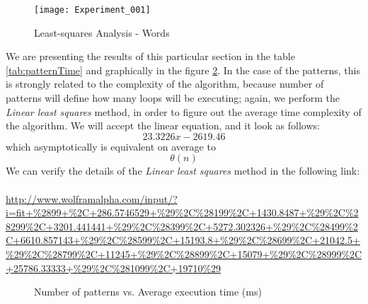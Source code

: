 \begin{figure}\centering
	\texttt{[image: Experiment\_001]}
	\caption{Least-squares Analysis - Words}\label{fig:Experiment_001}
\end{figure}


We are presenting the results of this particular section in the table \ref{tab:patternTime} and graphically in the figure \ref{fig:patternTime}. In the case of the patterns, this is strongly related to the complexity of the algorithm, because number of patterns will define how many loops will be executing; again, we perform the \emph{Linear least squares} method, in order to figure out the average time complexity of the algorithm. We will accept the linear equation, and it look as follows:
\[23.3226 x-2619.46\] 
which asymptotically is equivalent on average to 
\[\theta(n)\] 
We can verify the details of the \emph{Linear least squares} method in the following link:	
\\\\	
\url{http://www.wolframalpha.com/input/?i=fit+%2899+%2C+286.5746529+%29%2C%28199%2C+1430.8487+%29%2C%28299%2C+3201.441441+%29%2C%28399%2C+5272.302326+%29%2C%28499%2C+6610.857143+%29%2C%28599%2C+15193.8+%29%2C%28699%2C+21042.5+%29%2C%28799%2C+11245+%29%2C%28899%2C+15079+%29%2C%28999%2C+25786.33333+%29%2C%281099%2C+19710%29}

\begin{figure}\centering
	\caption{Number of patterns vs. Average execution time (ms)}\label{fig:patternTime}
\end{figure}


